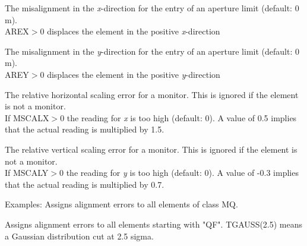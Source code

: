 \begin{madlist}
   The misalignment in the {\it x}-direction for the entry
  of an aperture limit (default: 0 m). \\ 
  AREX$>$0 displaces the element in the positive {\it x}-direction 

   The misalignment in the {\it y}-direction for the entry
  of an aperture limit (default: 0 m). \\ 
  AREY$>$0 displaces the element in the positive {\it y}-direction 

   The relative horizontal scaling error for a monitor. This
  is ignored if the element is not a monitor. \\ 
  If MSCALX$>$0 the reading for {\it x} is too high (default: 0). A
  value of 0.5 implies that the actual reading is multiplied by 1.5.  

   The relative vertical scaling error for a monitor. This is
  ignored if the element is not a monitor. \\  
  If MSCALY$>$0 the reading for {\it y} is too high (default: 0). A
  value of -0.3 implies that the actual reading is multiplied by 0.7.  
\end{madlist}

Examples: 
Assigns alignment errors to all elements of class MQ.           



Assigns alignment errors to all elements starting with "QF". TGAUSS(2.5)
means a Gaussian distribution cut at 2.5 sigma.  

